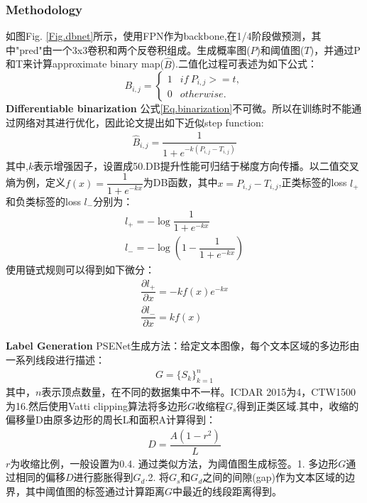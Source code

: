 \documentclass{article}
\begin{document}
\subsubsection{Methodology}
如图Fig. \ref{Fig.dbnet}所示，使用FPN作为backbone,在1/4阶段做预测，其中"pred"由一个3x3卷积和两个反卷积组成。生成概率图($P$)和阈值图($T$)，并通过P和T来计算approximate binary map($\hat{B}$).二值化过程可表述为如下公式：
\begin{equation}
B_{i,j} = \left\{
\begin{array}{lr}
1 & if \: P_{i,j} >=t, \\
0 & otherwise.
\end{array}
\right.
\label{Eq.binarization}
\end{equation}
\textbf{Differentiable binarization} 公式\ref{Eq.binarization}不可微。所以在训练时不能通过网络对其进行优化，因此论文提出如下近似step function:
\begin{align}
\hat{B}_{i,j}=\dfrac{1}{1+e^{-k(P_{i,j}-T_{i,j})}}
\end{align}
其中,$k$表示增强因子，设置成50.DB提升性能可归结于梯度方向传播。以二值交叉熵为例，定义$f(x)=\dfrac{1}{1+e^{-kx}}$为DB函数，其中$x=P_{i,j}-T_{i,j}$,正类标签的loss $l_+$和负类标签的loss $l_-$分别为：
\begin{equation}
\begin{aligned}
l_+ = -\log{\dfrac{1}{1+e^{-kx}}} \\
l_- = -\log{(1-\dfrac{1}{1+e^{-kx}})}
\end{aligned}
\end{equation}
使用链式规则可以得到如下微分：
\begin{align}
\dfrac{\partial l_+}{\partial x} = -kf(x)e^{-kx} \\
\dfrac{\partial l_-}{\partial x} = kf(x)
\end{align}

\textbf{Label Generation}
PSENet生成方法：给定文本图像，每个文本区域的多边形由一系列线段进行描述：
\begin{align}
G = \{ S_k \}_{k=1}^n
\end{align}
其中，$n$表示顶点数量，在不同的数据集中不一样。ICDAR 2015为4，CTW1500为16.然后使用Vatti clipping算法将多边形$G$收缩程$G_s$得到正类区域.其中，收缩的偏移量D由原多边形的周长L和面积A计算得到：
\begin{align}
D=\dfrac{A(1-r^2)}{L}
\end{align}
$r$为收缩比例，一般设置为0.4. 通过类似方法，为阈值图生成标签。1. 多边形$G$通过相同的偏移$D$进行膨胀得到$G_d$.2. 将$G_s$和$G_d$之间的间隙(gap)作为文本区域的边界，其中阈值图的标签通过计算距离$G$中最近的线段距离得到。
\end{document}
